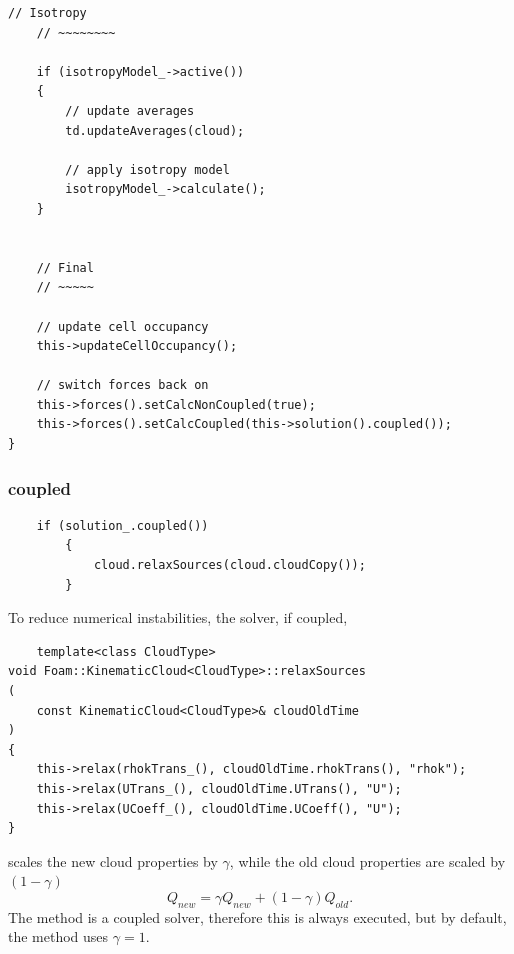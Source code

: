 \begin{lstlisting}[firstnumber=176,caption= motion from  MPPICCloud/MPPICCloud.C]
    // Isotropy
    // ~~~~~~~~

    if (isotropyModel_->active())
    {
        // update averages
        td.updateAverages(cloud);

        // apply isotropy model
        isotropyModel_->calculate();
    }


    // Final
    // ~~~~~

    // update cell occupancy
    this->updateCellOccupancy();

    // switch forces back on
    this->forces().setCalcNonCoupled(true);
    this->forces().setCalcCoupled(this->solution().coupled());
}

\end{lstlisting}
\fi



\subsubsection{coupled}
\ifcode
\begin{lstlisting}
    if (solution_.coupled())
        {
            cloud.relaxSources(cloud.cloudCopy());
        }
\end{lstlisting}
\fi
To reduce numerical instabilities, the solver, if coupled,
\ifcode
\begin{lstlisting}
    template<class CloudType>
void Foam::KinematicCloud<CloudType>::relaxSources
(
    const KinematicCloud<CloudType>& cloudOldTime
)
{
    this->relax(rhokTrans_(), cloudOldTime.rhokTrans(), "rhok");
    this->relax(UTrans_(), cloudOldTime.UTrans(), "U");
    this->relax(UCoeff_(), cloudOldTime.UCoeff(), "U");
}
\end{lstlisting}
\fi
scales the new cloud properties by $\gamma$, while the old cloud properties are scaled by $(1- \gamma)$
\begin{equation}
    Q_{new} = \gamma Q_{new} + (1- \gamma ) Q_{old}.
\end{equation}
The \MP method is a coupled solver, therefore this is always executed, but by default, the \MP method uses $\gamma = 1$. 
